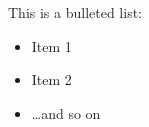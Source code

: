 

This is a bulleted list:

\begin{itemize}
\item Item 1
\item Item 2
\item \ldots and so on
\end{itemize}


\lipsum[6]



\lipsum[7]